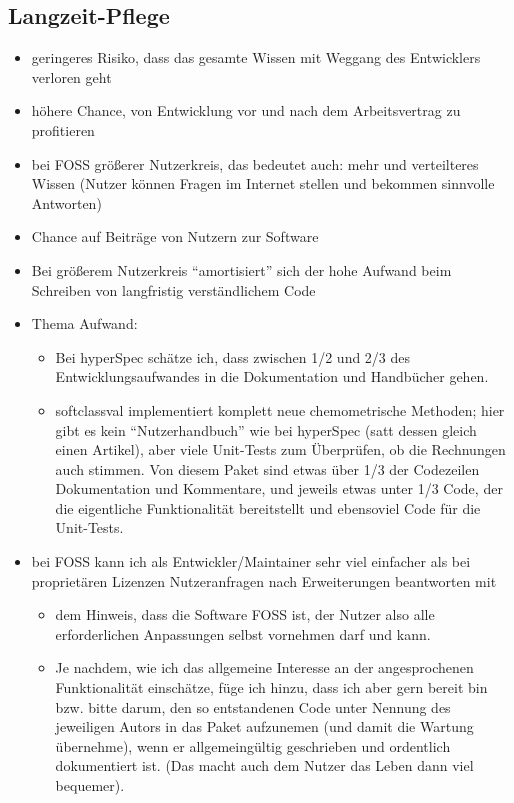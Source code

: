 \documentclass[11pt]{article}
\begin{document}
\subsection{Langzeit-Pflege}
\label{sec-2-2}

\begin{itemize}
\item geringeres Risiko, dass das gesamte Wissen mit Weggang des Entwicklers verloren geht
\item höhere Chance, von Entwicklung vor und nach dem Arbeitsvertrag zu profitieren
\item bei FOSS größerer Nutzerkreis, das bedeutet auch: mehr und verteilteres Wissen (Nutzer können
  Fragen im Internet stellen und bekommen sinnvolle Antworten)
\item Chance auf Beiträge von Nutzern zur Software
\item Bei größerem Nutzerkreis ``amortisiert'' sich der hohe Aufwand beim Schreiben von langfristig verständlichem Code
\item Thema Aufwand:
\begin{itemize}
\item Bei hyperSpec schätze ich, dass zwischen 1/2 und 2/3 des Entwicklungsaufwandes in die Dokumentation und Handbücher gehen.
\item softclassval implementiert komplett neue chemometrische Methoden; hier gibt es kein
    ``Nutzerhandbuch'' wie bei hyperSpec (satt dessen gleich einen Artikel), aber viele Unit-Tests zum Überprüfen, ob die
    Rechnungen auch stimmen. Von diesem Paket sind etwas über 1/3 der Codezeilen Dokumentation und
    Kommentare, und jeweils etwas unter 1/3 Code, der die eigentliche Funktionalität bereitstellt und
    ebensoviel Code für die Unit-Tests.
\end{itemize}
\item bei FOSS kann ich als Entwickler/Maintainer sehr viel einfacher als bei proprietären Lizenzen
  Nutzeranfragen nach Erweiterungen beantworten mit
\begin{itemize}
\item dem Hinweis, dass die Software FOSS ist, der Nutzer also alle erforderlichen Anpassungen selbst vornehmen darf und kann.
\item Je nachdem, wie ich das allgemeine Interesse an der angesprochenen Funktionalität einschätze,
    füge ich hinzu, dass ich aber gern bereit bin bzw. bitte darum, den so entstandenen Code unter
    Nennung des jeweiligen Autors in das Paket aufzunemen (und damit die Wartung übernehme), wenn er
    allgemeingültig geschrieben und ordentlich dokumentiert ist. (Das macht auch dem Nutzer das Leben
    dann viel bequemer).
\end{itemize}
\end{itemize}
\end{document}

